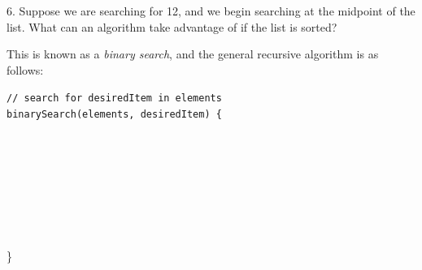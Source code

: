 \documentclass[11pt]{article}
\begin{document}
\vspace*{.25in}
 6. Suppose we are searching for 12, and we begin searching at the midpoint of the list. What can an algorithm take advantage of if the list is sorted?


\newpage
\noindent
This is known as a {\it binary search}, and the general recursive algorithm is as follows:

{\tt // search for desiredItem in elements}  \\ 
{\tt binarySearch(elements, desiredItem) \{ } \\
\hspace*{.25in}{\tt // calculate midpoint} \\ \\
\hspace*{.25in}{\tt if (desiredItem == element at midpoint)} \\
\hspace*{.5in}{\tt we found it!!} \\
\hspace*{.25in}{\tt else  if (desiredItem < element at midpoint)} \\
\hspace*{.5in}{\tt search left side of elements} \\
\hspace*{.25in}{\tt else} \\
\hspace*{.5in}{\tt search right side of elements}  \\
\} \\



\end{document}
